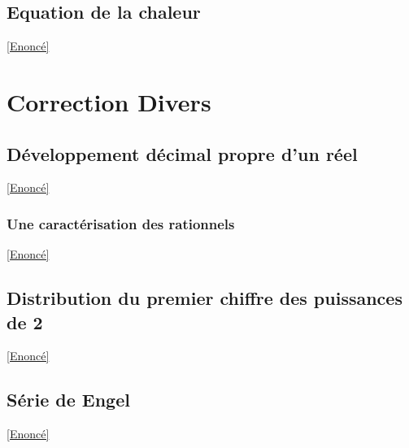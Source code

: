 \documentclass{book}
\begin{document}
	\subsection{Equation de la chaleur}
	\label{sec:equation-de-la-chaleur}
	\textcolor{blue}{\hyperref[Equation de la chaleur]{[Enoncé]}}\\
	
	
	\newpage
\section{Correction Divers}
	\subsection{Développement décimal propre d'un réel}
	\label{sec:developpement-decimal-propre-dun-reel}
	\textcolor{blue}{\hyperref[Développement décimal propre d'un réel]{[Enoncé]}}\\
	
	\subsubsection{Une caractérisation des rationnels}
	\label{Une caractérisation des rationnels corrigé}
	\textcolor{blue}{\hyperref[Une caractérisation des rationnels]{[Enoncé]}}\\
	
	\subsection{Distribution du premier chiffre des puissances de 2}
	\label{sec:distribution-du-premier-chiffre-des-puissances-de-2}
	\textcolor{blue}{\hyperref[Distribution du premier chiffre des puissances de 2]{[Enoncé]}}\\
	
	\subsection{Série de Engel}
	\label{sec:serie-de-engel}
	\textcolor{blue}{\hyperref[Série de Engel]{[Enoncé]}}\\
	
\end{document}
